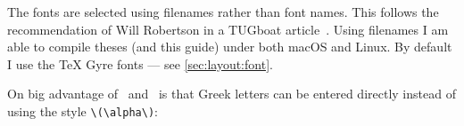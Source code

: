 The fonts are selected using filenames rather than font names.
This follows the recommendation of Will Robertson in a TUGboat article~\cite{tugboat:robertson}.
Using filenames I am able to compile theses (and this guide) under both macOS and Linux.
By default I use the TeX Gyre fonts --- see \cref{sec:layout:font}.

On big advantage of \LuaLaTeX\ and \XeLaTeX\ is that Greek letters can be entered directly
instead of using the style \verb|\(\alpha\)|:\\
